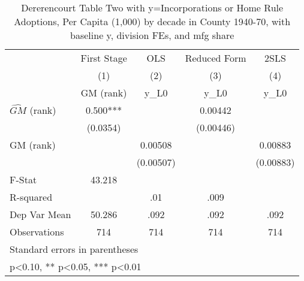 \begin{table}[htbp]\centering
\def\sym#1{\ifmmode^{#1}\else\(^{#1}\)\fi}
\caption{Dererencourt Table Two with y=Incorporations or Home Rule Adoptions, Per Capita (1,000) by decade in County 1940-70, with baseline y, division FEs, and mfg share}
\begin{tabular}{l*{4}{c}}
\toprule
                    & First Stage   &         OLS   &Reduced Form   &        2SLS   \\
                    &\multicolumn{1}{c}{(1)}&\multicolumn{1}{c}{(2)}&\multicolumn{1}{c}{(3)}&\multicolumn{1}{c}{(4)}\\
                    &\multicolumn{1}{c}{GM  (rank)}&\multicolumn{1}{c}{y\_L0}&\multicolumn{1}{c}{y\_L0}&\multicolumn{1}{c}{y\_L0}\\
\midrule
$\hat{GM}$ (rank)   &       0.500***&               &     0.00442   &               \\
                    &    (0.0354)   &               &   (0.00446)   &               \\
\addlinespace
GM  (rank)          &               &     0.00508   &               &     0.00883   \\
                    &               &   (0.00507)   &               &   (0.00883)   \\
\midrule
F-Stat              &      43.218   &               &               &               \\
R-squared           &               &         .01   &        .009   &               \\
Dep Var Mean        &      50.286   &        .092   &        .092   &        .092   \\
Observations        &         714   &         714   &         714   &         714   \\
\bottomrule
\multicolumn{5}{l}{\footnotesize Standard errors in parentheses}\\
\multicolumn{5}{l}{\footnotesize * p<0.10, ** p<0.05, *** p<0.01}\\
\end{tabular}
\end{table}
